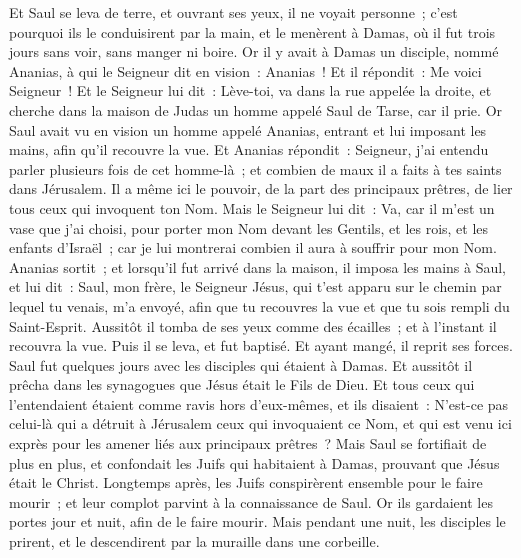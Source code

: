 \begin{multicols}{2}
Et Saul se leva de terre, et ouvrant ses yeux, il ne voyait personne~; c'est pourquoi ils le conduisirent par la main, et le menèrent à Damas,
où il fut trois jours sans voir, sans manger ni boire.
Or il y avait à Damas un disciple, nommé Ananias, à qui le Seigneur dit en vision~: Ananias~! Et il répondit~: Me voici Seigneur~!
Et le Seigneur lui dit~: Lève-toi, va dans la rue appelée la droite, et cherche dans la maison de Judas un homme appelé Saul de Tarse,
car il prie. Or Saul avait vu en vision un homme appelé Ananias, entrant et lui imposant les mains, afin qu'il recouvre la vue. Et Ananias répondit~:
 Seigneur, j'ai entendu parler plusieurs fois de cet homme-là~; et combien de maux il a faits à tes saints dans Jérusalem.
Il a même ici le pouvoir, de la part des principaux prêtres, de lier tous ceux qui invoquent ton Nom.
Mais le Seigneur lui dit~: Va, car il m'est un vase que j'ai choisi, pour porter mon Nom devant les Gentils, et les rois, et les enfants d'Israël~;
car je lui montrerai combien il aura à souffrir pour mon Nom.
Ananias sortit~; et lorsqu'il fut arrivé dans la maison, il imposa les mains à Saul, et lui dit~: Saul, mon frère, le Seigneur Jésus, qui t'est apparu sur le chemin par lequel tu venais, m'a envoyé, afin que tu recouvres la vue et que tu sois rempli du Saint-Esprit.
Aussitôt il tomba de ses yeux comme des écailles~; et à l'instant il recouvra la vue. Puis il se leva, et fut baptisé.
Et ayant mangé, il reprit ses forces. Saul fut quelques jours avec les disciples qui étaient à Damas.
Et aussitôt il prêcha dans les synagogues que Jésus était le Fils de Dieu.
Et tous ceux qui l'entendaient étaient comme ravis hors d'eux-mêmes, et ils disaient~: N'est-ce pas celui-là qui a détruit à Jérusalem ceux qui invoquaient ce Nom, et qui est venu ici exprès pour les amener liés aux principaux prêtres~?
Mais Saul se fortifiait de plus en plus, et confondait les Juifs qui habitaient à Damas, prouvant que Jésus était le Christ.
Longtemps après, les Juifs conspirèrent ensemble pour le faire mourir~;
et leur complot parvint à la connaissance de Saul. Or ils gardaient les portes jour et nuit, afin de le faire mourir.
Mais pendant une nuit, les disciples le prirent, et le descendirent par la muraille dans une corbeille.

\end{multicols}
